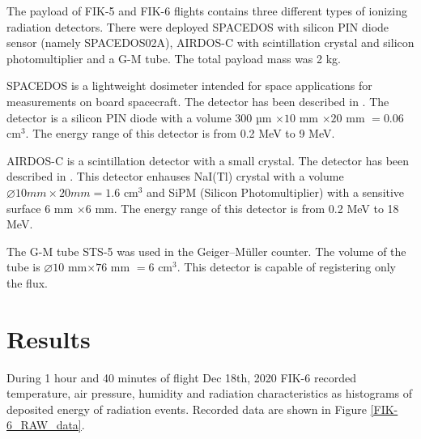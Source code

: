 \documentclass{Rpd}
\begin{document}
The payload of FIK-5 and FIK-6 flights contains three different types of ionizing radiation detectors. There were deployed SPACEDOS with silicon PIN diode sensor (namely SPACEDOS02A), AIRDOS-C with scintillation crystal and silicon photomultiplier and a G-M tube. The total payload mass was 2 kg.

SPACEDOS is a lightweight dosimeter intended for space applications for measurements on board spacecraft. The detector has been described in \cite{SPACEDOS}. The detector is a silicon PIN diode with a volume $300$ µm $\times 10$ mm $\times 20$ mm $= 0.06$ cm$^3$. The energy range of this detector is from 0.2 MeV to 9 MeV.

AIRDOS-C is a scintillation detector with a small crystal. The detector has been described in \cite{AIRDOS-C}. This detector enhauses NaI(Tl) crystal with a volume   $\diameter 10 mm \times 20 mm = 1.6$ cm$^3$ and SiPM (Silicon Photomultiplier) with a sensitive surface $6$ mm $\times 6$ mm. The energy range of this detector is from 0.2 MeV to 18 MeV.

The G-M tube STS-5 was used in the Geiger–Müller counter. The volume of the tube is $\diameter 10$ mm$ \times 76$ mm $= 6$ cm$^3$. This detector is capable of registering only the flux.

\section{Results}

During 1 hour and 40 minutes of flight Dec 18th, 2020 FIK-6 recorded temperature, air pressure, humidity and radiation characteristics as histograms of deposited energy of radiation events. Recorded data are shown in Figure \ref{FIK-6_RAW_data}.
\end{document}
